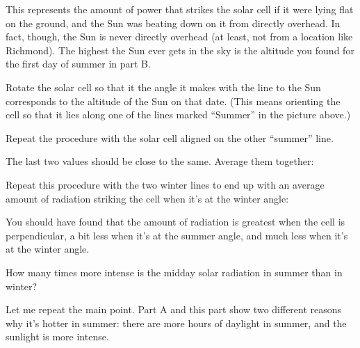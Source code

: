 \answerspace{0.25in}

This represents the amount of power that strikes the solar cell
if it were lying flat on the ground, and the Sun was beating down
on it from directly overhead. In fact, though, the Sun is never
directly overhead (at least, not from a location like Richmond).
The highest the Sun ever gets in the sky is the altitude you found
for the first day of summer in part B.

Rotate the solar cell so that it the angle it makes with
the line to the Sun corresponds to the altitude of the
Sun on that date. (This means orienting the cell so that it
lies along one of the lines marked ``Summer'' in the picture above.)

\answerspace{1in}

\pagebreak[2]
Repeat the procedure with the solar cell aligned on the other ``summer''
line.  

\answerspace{1in}

The last two values should be close to the same.  Average them
together:

\answerspace{1in}

Repeat this procedure with the two winter lines to end
up with an average amount of radiation striking the cell
when it's at the winter angle:

\answerspace{2in}

You should have found that the amount of radiation is greatest
when the cell is perpendicular, a bit less when it's at the summer
angle, and much less when it's at the winter angle.

How many times more intense is the midday solar radiation in summer
than in winter?

\answerspace{1in}

Let me repeat the main point. Part A and this part 
show two different reasons why it's hotter in summer: there are more
hours of daylight in summer, and the sunlight is more intense.



